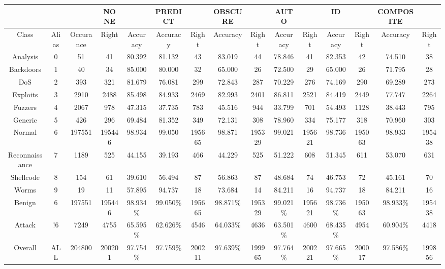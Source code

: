 \begin{table}[htb]
    \centering
    \begin{tabular}{@{}ccccccccccccccc@{}}
        \toprule
         &  &  & NONE &  & PREDICT &  & OBSCURE &  & AUTO &  & ID &  & COMPOSITE &  \\
        \midrule
        Class &  Alias &  Occurance &  Right &  Accuracy &  Accuracy &  Right &  Accuracy &  Right &  Accuracy &  Right &  Accuracy &  Right &  Accuracy &  Right \\
        Analysis &  0 &  51 &  41 &  80.392 &  81.132 &  43 &  83.019 &  44 &  78.846 &  41 &  82.353 &  42 &  74.510 &  38 \\
        Backdoors &  1 &  40 &  34 &  85.000 &  80.000 &  32 &  65.000 &  26 &  72.500 &  29 &  65.000 &  26 &  71.795 &  28 \\
        DoS &  2 &  393 &  321 &  81.679 &  76.081 &  299 &  72.843 &  287 &  70.229 &  276 &  74.169 &  290 &  69.289 &  273 \\
        Exploits &  3 &  2910 &  2488 &  85.498 &  84.933 &  2469 &  82.993 &  2401 &  86.811 &  2521 &  84.419 &  2449 &  77.747 &  2264 \\
        Fuzzers &  4 &  2067 &  978 &  47.315 &  37.735 &  783 &  45.516 &  944 &  33.799 &  701 &  54.493 &  1128 &  38.443 &  795 \\
        Generic &  5 &  426 &  296 &  69.484 &  81.352 &  349 &  72.131 &  308 &  78.960 &  334 &  75.177 &  318 &  70.960 &  303 \\
        Normal &  6 &  197551 &  195446 &  98.934 &  99.050 &  195665 &  98.871 &  195329 &  99.021 &  195621 &  98.736 &  195063 &  98.933 &  195438 \\
        Reconnaissance &  7 &  1189 &  525 &  44.155 &  39.193 &  466 &  44.229 &  525 &  51.222 &  608 &  51.345 &  611 &  53.070 &  631 \\
        Shellcode &  8 &  154 &  61 &  39.610 &  56.494 &  87 &  56.863 &  87 &  48.684 &  74 &  46.753 &  72 &  45.161 &  70 \\
        Worms &  9 &  19 &  11 &  57.895 &  94.737 &  18 &  73.684 &  14 &  84.211 &  16 &  94.737 &  18 &  84.211 &  16 \\
        Benign &  6 &  197551 &  195446 &  98.934\% &  99.050\% &  195665 &  98.871\% &  195329 &  99.021\% &  195621 &  98.736\% &  195063 &  98.933\% &  195438 \\
        Attack &  !6 &  7249 &  4755 &  65.595\% &  62.626\% &  4546 &  64.033\% &  4636 &  63.501\% &  4600 &  68.435\% &  4954 &  60.904\% &  4418 \\
        Overall &  ALL &  204800 &  200201 &  97.754\% &  97.759\% &  200211 &  97.639\% &  199965 &  97.764\% &  200221 &  97.665\% &  200017 &  97.586\% &  199856 \\
        \bottomrule
    \end{tabular}
\end{table}